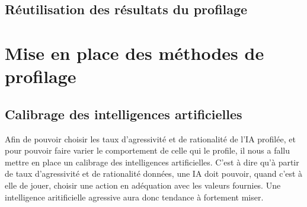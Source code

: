 \documentclass{report}
\begin{document}
\section{Réutilisation des résultats du profilage}


\chapter{Mise en place des méthodes de profilage}

\section{Calibrage des intelligences artificielles}

\hspace{0.5cm}Afin de pouvoir choisir les taux d'agressivité et de rationalité de l'IA profilée, et pour pouvoir faire varier le comportement de celle qui le profile, il nous a fallu mettre en place un calibrage des intelligences artificielles. C'est à dire qu'à partir de taux d'agressivité et de rationalité données, une IA doit pouvoir, quand c'est à elle de jouer, choisir une action en adéquation avec les valeurs fournies. Une intelligence aritificielle agressive aura donc tendance à fortement miser.\\
\end{document}
